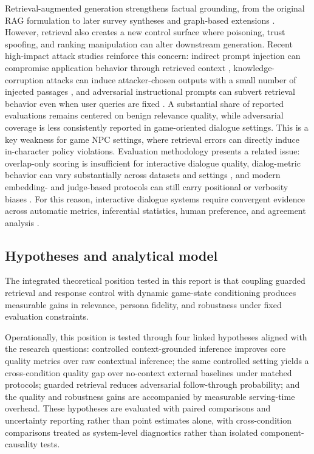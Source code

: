 ﻿\documentclass[a4paper,12pt]{article}
\begin{document}
Retrieval-augmented generation strengthens factual grounding, from the original RAG formulation to later survey syntheses and graph-based extensions \cite{Lewis2020RAG,Fan2024RAGSurvey,Edge2024GraphRAG}. However, retrieval also creates a new control surface where poisoning, trust spoofing, and ranking manipulation can alter downstream generation. Recent high-impact attack studies reinforce this concern: indirect prompt injection can compromise application behavior through retrieved context \cite{Greshake2023PromptInjection}, knowledge-corruption attacks can induce attacker-chosen outputs with a small number of injected passages \cite{Zou2025PoisonedRAG}, and adversarial instructional prompts can subvert retrieval behavior even when user queries are fixed \cite{Chaturvedi2025AIP}. A substantial share of reported evaluations remains centered on benign relevance quality, while adversarial coverage is less consistently reported in game-oriented dialogue settings. This is a key weakness for game NPC settings, where retrieval errors can directly induce in-character policy violations. Evaluation methodology presents a related issue: overlap-only scoring is insufficient for interactive dialogue quality, dialog-metric behavior can vary substantially across datasets and settings \cite{Yeh2021DialogMetrics}, and modern embedding- and judge-based protocols can still carry positional or verbosity biases \cite{Zhang2020BERTScore,Zheng2023MTBench,Wang2024Judge,Dubois2024AlpacaEval}. For this reason, interactive dialogue systems require convergent evidence across automatic metrics, inferential statistics, human preference, and agreement analysis \cite{Cohen1960Kappa}.

\subsection{Hypotheses and analytical model}
The integrated theoretical position tested in this report is that coupling guarded retrieval and response control with dynamic game-state conditioning produces measurable gains in relevance, persona fidelity, and robustness under fixed evaluation constraints.

Operationally, this position is tested through four linked hypotheses aligned with the research questions: controlled context-grounded inference improves core quality metrics over raw contextual inference; the same controlled setting yields a cross-condition quality gap over no-context external baselines under matched protocols; guarded retrieval reduces adversarial follow-through probability; and the quality and robustness gains are accompanied by measurable serving-time overhead. These hypotheses are evaluated with paired comparisons and uncertainty reporting rather than point estimates alone, with cross-condition comparisons treated as system-level diagnostics rather than isolated component-causality tests.
\end{document}
